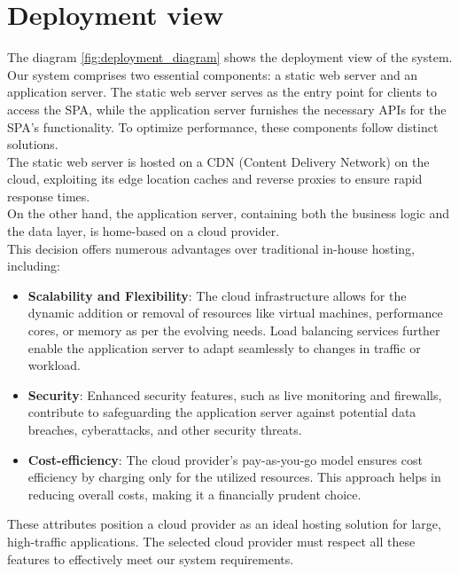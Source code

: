 \section{Deployment view}
The diagram \ref{fig:deployment_diagram} shows the deployment view of the system.\\
Our system comprises two essential components: a static web server and an application server. 
The static web server serves as the entry point for clients to access the SPA, while the application server furnishes the necessary APIs for the SPA's functionality. 
To optimize performance, these components follow distinct solutions.\\
The static web server is hosted on a CDN (Content Delivery Network) on the cloud, exploiting its edge location caches and reverse proxies to ensure rapid response times. \\
On the other hand, the application server, containing both the business logic and the data layer, is home-based on a cloud provider. \\
This decision offers numerous advantages over traditional in-house hosting, including:
\begin{itemize}
    \item \textbf{Scalability and Flexibility}: The cloud infrastructure allows for the dynamic addition or removal of resources like virtual machines, performance cores, or memory as per the evolving needs. Load balancing services further enable the application server to adapt seamlessly to changes in traffic or workload.
    \item \textbf{Security}: Enhanced security features, such as live monitoring and firewalls, contribute to safeguarding the application server against potential data breaches, cyberattacks, and other security threats.
    \item \textbf{Cost-efficiency}: The cloud provider's pay-as-you-go model ensures cost efficiency by charging only for the utilized resources. This approach helps in reducing overall costs, making it a financially prudent choice.
\end{itemize}
These attributes position a cloud provider as an ideal hosting solution for large, high-traffic applications. 
The selected cloud provider must respect all these features to effectively meet our system requirements.

